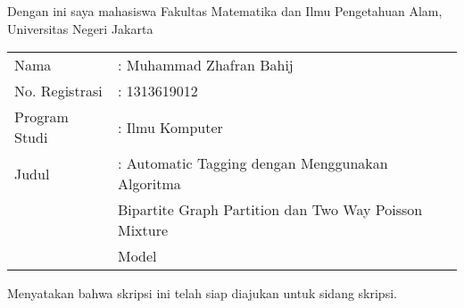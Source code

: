 \chapter*{}
\thispagestyle{empty} {\bf }Dengan ini saya mahasiswa Fakultas
Matematika dan Ilmu Pengetahuan Alam, Universitas Negeri Jakarta

\vskip3mm

\begin{tabular}{ll}
  Nama & : Muhammad Zhafran Bahij \\
  No. Registrasi & : 1313619012\\
  Program Studi & : Ilmu Komputer \\
  Judul & : Automatic Tagging dengan Menggunakan Algoritma \\ & \hspace{0.2cm} Bipartite Graph Partition dan Two Way Poisson Mixture \\ & \hspace{0.2cm} Model
\end{tabular}

\vskip3mm

\noindent \hskip10mm 
\begin{center}
Menyatakan bahwa skripsi ini telah siap diajukan untuk sidang skripsi.
\end{center}



